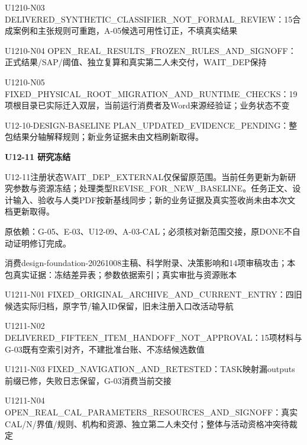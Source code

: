\documentclass[11pt,a4paper]{article}
\newcommand{\reviewsection}[1]{\par\Needspace{5\baselineskip}\vspace{10pt}\begin{center}{\titlelatin\titlecjk\bfseries\fontsize{14}{20}\selectfont #1}\end{center}}
\begin{document}
U1210-\allowbreak{}N03 DELIVERED\_\allowbreak{}SYNTHETIC\_\allowbreak{}CLASSIFIER\_\allowbreak{}NOT\_\allowbreak{}FORMAL\_\allowbreak{}REVIEW：15合成案例和主张规则可重跑，A-\allowbreak{}05候选可用性订正，不填真实结果


U1210-\allowbreak{}N04 OPEN\_\allowbreak{}REAL\_\allowbreak{}RESULTS\_\allowbreak{}FROZEN\_\allowbreak{}RULES\_\allowbreak{}AND\_\allowbreak{}SIGNOFF：正式结果/\allowbreak{}SAP/\allowbreak{}阈值、独立复算和真实第二人未交付，WAIT\_\allowbreak{}DEP保持


U1210-\allowbreak{}N05 FIXED\_\allowbreak{}PHYSICAL\_\allowbreak{}ROOT\_\allowbreak{}MIGRATION\_\allowbreak{}AND\_\allowbreak{}RUNTIME\_\allowbreak{}CHECKS：19项根目录已实际迁入双层，当前运行消费者及Word来源经验证；业务状态不变


U12-\allowbreak{}10-\allowbreak{}DESIGN-\allowbreak{}BASELINE PLAN\_\allowbreak{}UPDATED\_\allowbreak{}EVIDENCE\_\allowbreak{}PENDING：整包结果分轴解释规则；新业务证据未由文档刷新取得。


\reviewsection{U12-\allowbreak{}11 研究冻结}
U12-\allowbreak{}11注册状态WAIT\_\allowbreak{}DEP\_\allowbreak{}EXTERNAL仅保留原范围。当前任务更新为新研究参数与资源冻结；处理类型REVISE\_\allowbreak{}FOR\_\allowbreak{}NEW\_\allowbreak{}BASELINE。任务正文、设计输入、验收与人类PDF按新基线同步；新的业务证据及真实签收尚未由本次文档更新取得。


原依赖：G-\allowbreak{}05、E-\allowbreak{}03、U12-\allowbreak{}09、A-\allowbreak{}03-\allowbreak{}CAL；必须核对新范围交接，原DONE不自动证明修订完成。


消费design-\allowbreak{}foundation-\allowbreak{}20261008主稿、科学附录、决策影响和14项审稿攻击；本包真实证据：冻结差异表；参数依据索引；真实审批与资源账本


U1211-\allowbreak{}N01 FIXED\_\allowbreak{}ORIGINAL\_\allowbreak{}ARCHIVE\_\allowbreak{}AND\_\allowbreak{}CURRENT\_\allowbreak{}ENTRY：四旧候选实际归档，原字节/\allowbreak{}输入ID保留，旧未注册入口改活动导航


U1211-\allowbreak{}N02 DELIVERED\_\allowbreak{}FIFTEEN\_\allowbreak{}ITEM\_\allowbreak{}HANDOFF\_\allowbreak{}NOT\_\allowbreak{}APPROVAL：15项材料与G-\allowbreak{}03既有空索引对齐，不建批准台账、不冻结候选数值


U1211-\allowbreak{}N03 FIXED\_\allowbreak{}NAVIGATION\_\allowbreak{}AND\_\allowbreak{}RETESTED：TASK映射漏outputs前缀已修，失败日志保留，G-\allowbreak{}03消费当前交接


U1211-\allowbreak{}N04 OPEN\_\allowbreak{}REAL\_\allowbreak{}CAL\_\allowbreak{}PARAMETERS\_\allowbreak{}RESOURCES\_\allowbreak{}AND\_\allowbreak{}SIGNOFF：真实CAL/\allowbreak{}N/\allowbreak{}界值/\allowbreak{}规则、机构和资源、独立第二人未交付；整体与活动资格冲突待裁定
\end{document}
